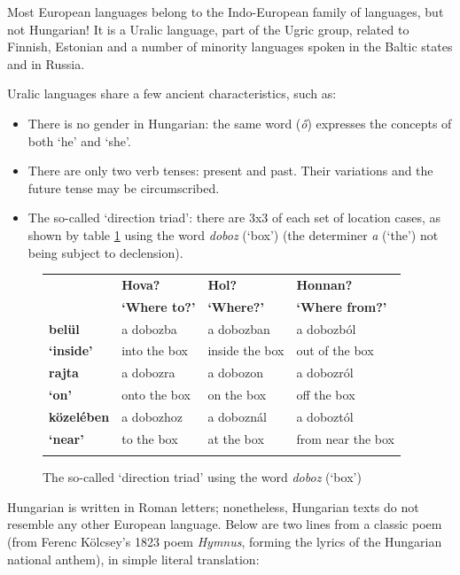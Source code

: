 \begin{multicols}{2}
Most European languages belong to the Indo-European family of languages, but not Hungarian! It is a Uralic language, part of the Ugric group, related to Finnish, Estonian and a number of minority languages spoken in the Baltic states and in Russia.

Uralic languages share a few ancient characteristics, such as: 

\begin{itemize}
\item There is no gender in Hungarian: the same word (\textit{ő}) expresses the concepts of both `he' and `she'. 
\item There are only two verb tenses: present and past. Their variations and the future tense may be circumscribed. 
\item The so-called `direction triad': there are 3x3 of each set of location cases, as shown by table \ref{doboz_en} using the word \textit{doboz} (`box') (the determiner \textit{a} (`the') not being subject to declension).
\end{itemize}

\begin{figure}[htb]
  \setlength{\tabcolsep}{2em}
  \begin{tabularx}{\textwidth}{llll} \toprule\addlinespace
    \textbf{} & \textbf{Hova?} & \textbf{Hol?} & \textbf{Honnan?}\\
    \textbf{} & \textbf{`Where to?'} & \textbf{`Where?'} & \textbf{`Where from?'}\\
     \addlinespace\midrule\addlinespace
    \textbf{belül} & a dobozba & a dobozban & a dobozból\\
    \textbf{`inside'} & into the box & inside the box & out of the box\\
    \addlinespace\midrule\addlinespace
    \textbf{rajta} & a dobozra & a dobozon & a dobozról\\
    \textbf{`on'} & onto the box & on the box & off the box\\ 
    \addlinespace\midrule\addlinespace
    \textbf{közelében} & a dobozhoz & a doboznál & a doboztól\\
    \textbf{`near'} & to the box & at the box & from near the box\\ \addlinespace\bottomrule
  \end{tabularx}
  \caption{The so-called `direction triad' using the word \textit{doboz} (`box')}
  \label{doboz_en}
\end{figure}

Hungarian is written in Roman letters; nonetheless, Hungarian texts do not resemble any other European language. Below are two lines from a classic poem (from Ferenc Kölcsey's 1823 poem \textit{Hymnus}, forming the lyrics of the Hungarian national anthem), in simple literal translation:


\end{multicols}
